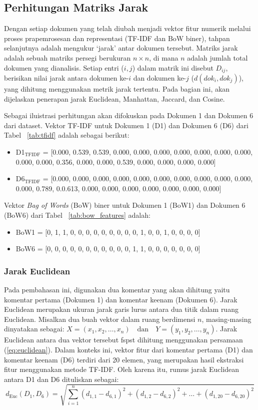 \documentclass[a4paper,12pt]{report}
\numberwithin{equation}{chapter}
\begin{document}
\subsection{Perhitungan Matriks Jarak}
Dengan setiap dokumen yang telah diubah menjadi vektor fitur numerik melalui proses prapemrosesan dan representasi (TF-IDF dan BoW biner), tahpan selanjutnya adalah mengukur `jarak' antar dokumen tersebut. Matriks jarak adalah sebuah matriks persegi berukuran $n \times n$, di mana $n$ adalah jumlah total dokumen yang dianalisis. Setiap entri ($i, j$) dalam matrik ini disebut $D_{ij}$, berisikan nilai jarak antara dokumen ke-$i$ dan dokumen ke-$j$ ($d(dok_i,dok_j)$), yang dihitung menggunakan metrik jarak tertentu. Pada bagian ini, akan dijelaskan penerapan jarak Euclidean, Manhattan, Jaccard, dan Cosine.

Sebagai iluistrasi perhitungan akan difokuskan pada Dokumen 1 dan Dokumen 6 dari dataset. Vektor TF-IDF untuk Dokumen 1 (D1) dan Dokumen 6 (D6) dari Tabel ~\ref{tab:tfidf} adalah sebagai berikut: 

\begin{itemize}
    \item D1$_{\text{TFIDF}}$ = [0.000, 0.539, 0.539, 0.000, 0.000, 0.000, 0.000, 0.000, 0.000, 0.000, 0.000, 0.000, 0.356, 0.000, 0.000, 0.539, 0.000, 0.000, 0.000, 0.000]
    \item D6$_{\text{TFIDF}}$ = [0.000, 0.000, 0.000, 0.000, 0.000, 0.000, 0.000, 0.000, 0.000, 0.000, 0.000, 0.789, 0.0.613, 0.000, 0.000, 0.000, 0.000, 0.000, 0.000, 0.000]
\end{itemize}

Vektor \textit{Bag of Words} (BoW) biner untuk Dokumen 1 (BoW1) dan Dokumen 6 (BoW6) dari Tabel ~\ref{tab:bow_features} adalah:


\begin{itemize}
    \item BoW1 = [0, 1, 1, 0, 0, 0, 0, 0, 0, 0, 0, 0, 1, 0, 0, 1, 0, 0, 0, 0]
    \item BoW6 = [0, 0, 0, 0, 0, 0, 0, 0, 0, 0, 0, 1, 1, 0, 0, 0, 0, 0, 0, 0]
\end{itemize}

\subsubsection{Jarak Euclidean}
Pada pembahasan ini, digunakan dua komentar yang akan dihitung yaitu komentar pertama (Dokumen 1) dan komentar keenam (Dokumen 6). Jarak Euclidean merupakan ukuran jarak garis lurus antara dua titik dalam ruang Euclidean. Misalkan dua buah vektor dalam ruang berdimensi \(n\), masing-masing dinyatakan sebagai: $
X = (x_1, x_2, \ldots, x_n) \quad \text{dan} \quad Y = (y_1, y_2, \ldots, y_n)$. Jarak Euclidean antara dua vektor tersebut fspst dihitung menggunakan persamaan (\ref{eq:euclidean}). Dalam konteks ini, vektor fitur dari komentar pertama (D1) dan komentar keenam (D6) terdiri dari 20 elemen, yang merupakan hasil ekstraksi fitur menggunakan metode TF-IDF. Oleh karena itu, rumus jarak Euclidean antara D1 dan D6 dituliskan sebagai:
\[
d_{\text{Euc}}(D_1, D_6) = \sqrt{\sum_{i=1}^{n} (d_{1,1} - d_{6,1})^2 + (d_{1,2} - d_{6,2})^2 + \ldots + (d_{1,20} - d_{6,20})^2}
\]
\end{document}
